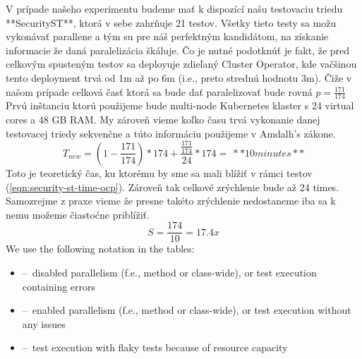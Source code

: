 V prípade našeho experimentu budeme mať k dispozící našu testovaciu triedu **SecurityST**, ktorá v sebe zahrňuje 21 testov.
Všetky tieto testy sa možu vykonávať parallene a tým su pre náš perfektným kandidátom, na získanie informacie že daná
paralelizácia škáluje. Čo je nutné podotknúť je fakt, že pred celkovým spusteným testov sa deployuje zdieľaný Cluster Operator,
kde vačšinou tento deployment trvá od 1m až po 6m (i.e., preto strednú hodnotu 3m). Čiže v našom prípade celková časť
ktorá sa bude dať paralelizovať bude rovná $p = \frac{171}{174} $  Prvú inštanciu ktorú použijeme bude multi-node
Kubernetes klaster s 24 virtual cores a 48 GB RAM. My zároveň vieme koľko času trvá vykonanie danej testovacej triedy
sekvenčne a túto informáciu použijeme v Amdalh's zákone.
\begin{equation}
    \label{eqn:security-st-time-ocp}
    T_{new} = (1 - \frac{171}{174}) * 174 +  \frac{ \frac{171}{174}}{24} * 174 = ~**10 minutes**
    \tag{6}
\end{equation}
Toto je teoretický čas, ku ktorému by sme sa mali blížiť v rámci testov (\eqref{eqn:security-st-time-ocp}).
Zároveň tak celkové zrýchlenie bude až 24 times. Samozrejme z praxe vieme že presne takéto zrýchlenie nedostaneme
iba sa k nemu možeme čiastoćne priblížiť.
\begin{equation}
    \label{eqn:method-wide}
    S = \frac{174}{10} =17.4x
    \tag{7}
\end{equation}
We use the following notation in the tables:
\begin{itemize}[itemsep=1mm, parsep=0pt]
    \item {\xmark} \---\ disabled parallelism (f.e., method or class-wide), or test execution containing errors
    \item {\cmark} \---\ enabled parallelism (f.e., method or class-wide), or test execution without any issues
    \item {\selectfont{}\relax} \---\ test execution with flaky tests because of resource capacity
\end{itemize}

